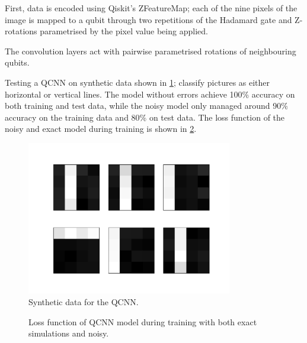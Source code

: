 First, data is encoded using Qiskit's ZFeatureMap; each of the nine pixels of the image is mapped to a qubit through two repetitions of the Hadamard gate and Z-rotations parametrised by the pixel value being applied.

The convolution layers act with pairwise parametrised rotations of neighbouring qubits.



Testing a QCNN on synthetic data shown in \cref{fig:qcnn_data}; classify pictures as either horizontal or vertical lines. The model without errors achieve 100\% accuracy on both training and test data, while the noisy model only managed around 90\% accuracy on the training data and 80\% on test data. The loss function of the noisy and exact model during training is shown in \cref{fig:qcnn_loss}.


\begin{figure}
    \centering
    \includegraphics[width=0.8\textwidth]{../code/qcnn/data.pdf}
    \caption{Synthetic data for the QCNN.}
    \label{fig:qcnn_data}
\end{figure}


\begin{figure}
    \centering
    \caption{Loss function of QCNN model during training with both exact simulations and noisy.}
    \label{fig:qcnn_loss}
\end{figure}


